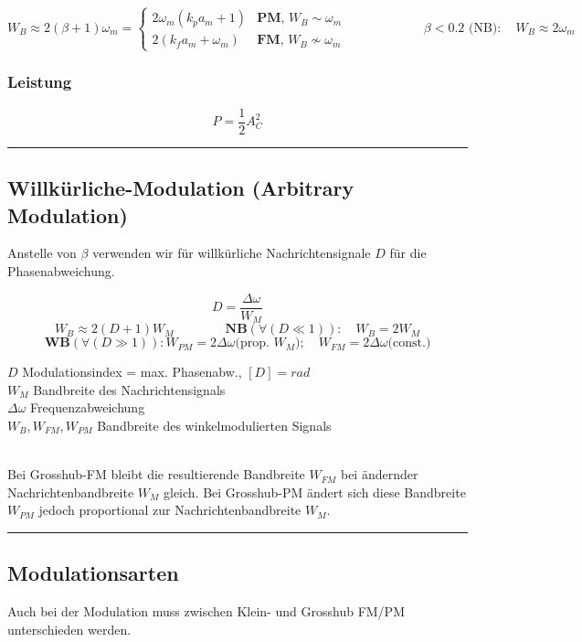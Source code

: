 \begin{center}
$W_B \approx 2(\beta + 1) \omega_m = 
	\begin{cases}
  		2 \omega_m (k_p a_m + 1) & \textbf{PM},\, W_B \sim \omega_m \\
  		2(k_f a_m + \omega_m) & \textbf{FM},\, W_B \nsim \omega_m \end{cases} \qquad
  		\qquad \qquad \beta < 0.2 \text{ (NB)}: \quad W_{B} \approx 2 \omega_m
$
\end{center}

\subsubsection{Leistung }
$$P = \frac12 A_C^2$$
\hrule


\subsection{Willkürliche-Modulation (Arbitrary Modulation) }
Anstelle von $\beta$ verwenden wir für willkürliche Nachrichtensignale $D$ für die
Phasenabweichung.\\ 
\begin{minipage}[t][2.7cm][c]{10cm}
	$$ D = \frac{\Delta \omega}{W_M} $$	
$$W_B \approx 2(D + 1) W_M \qquad \qquad 
	\textbf{NB}(\forall (D \ll 1)): \quad W_{B} = 2 W_M $$
 $$ \textbf{WB} (\forall (D \gg 1)): W_{PM} = 2 \Delta \omega \text{(prop. $W_M$)};
 \quad W_{FM} = 2 \Delta \omega \text{(const.)} $$
\end{minipage} \hspace{0.6cm}
\begin{minipage}[t][2.7cm][c]{8cm} 
	$D$ Modulationsindex = max. Phasenabw., $[D] = rad$ \\
	$W_M$ Bandbreite des Nachrichtensignals \\
	$\Delta \omega$ Frequenzabweichung \\
	$W_B,W_{FM},W_{PM}$ Bandbreite des winkelmodulierten Signals
\end{minipage} \\
Bei Grosshub-FM bleibt die resultierende Bandbreite $W_{FM}$ bei ändernder Nachrichtenbandbreite
$W_M$ gleich. Bei Grosshub-PM ändert sich diese Bandbreite$W_{PM}$ jedoch proportional zur
Nachrichtenbandbreite $W_M$.\\

\hrule
\subsection{Modulationsarten}
Auch bei der Modulation muss zwischen Klein- und Grosshub FM/PM unterschieden werden.

